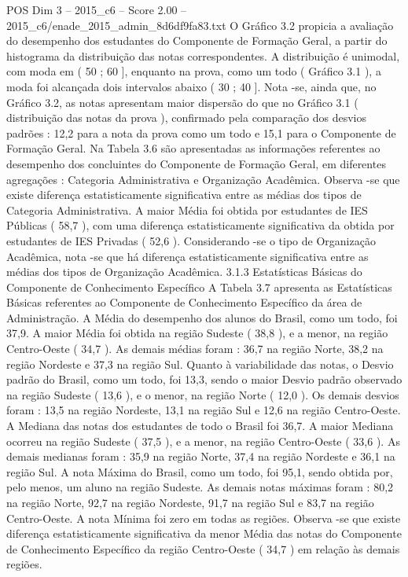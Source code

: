 \begin{textsample}{POS Dim 3 – 2015\_c6 – Score 2.00 – 2015\_c6/enade\_2015\_admin\_8d6df9fa83.txt}
O Gráfico 3.2 propicia a avaliação do desempenho dos estudantes do Componente de Formação Geral, a partir do histograma da distribuição das notas correspondentes.
A distribuição é unimodal, com moda em ( 50 ; 60 ], enquanto na prova, como um todo ( Gráfico 3.1 ), a moda foi alcançada dois intervalos abaixo ( 30 ; 40 ].
Nota -se, ainda que, no Gráfico 3.2, as notas apresentam maior dispersão do que no Gráfico 3.1 ( distribuição das notas da prova ), confirmado pela comparação dos desvios padrões : 12,2 para a nota da prova como um todo e 15,1 para o Componente de Formação Geral.
Na Tabela 3.6 são apresentadas as informações referentes ao desempenho dos concluintes do Componente de Formação Geral, em diferentes agregações : Categoria Administrativa e Organização Acadêmica.
Observa -se que existe diferença estatisticamente significativa entre as médias dos tipos de Categoria Administrativa.
A maior Média foi obtida por estudantes de IES Públicas ( 58,7 ), com uma diferença estatisticamente significativa da obtida por estudantes de IES Privadas ( 52,6 ).
Considerando -se o tipo de Organização Acadêmica, nota -se que há diferença estatisticamente significativa entre as médias dos tipos de Organização Acadêmica. 3.1.3 Estatísticas Básicas do Componente de Conhecimento Específico A Tabela 3.7 apresenta as Estatísticas Básicas referentes ao Componente de Conhecimento Específico da área de Administração.
A Média do desempenho dos alunos do Brasil, como um todo, foi 37,9.
A maior Média foi obtida na região Sudeste ( 38,8 ), e a menor, na região Centro-Oeste ( 34,7 ).
As demais médias foram : 36,7 na região Norte, 38,2 na região Nordeste e 37,3 na região Sul.
Quanto à variabilidade das notas, o Desvio padrão do Brasil, como um todo, foi 13,3, sendo o maior Desvio padrão observado na região Sudeste ( 13,6 ), e o menor, na região Norte ( 12,0 ).
Os demais desvios foram : 13,5 na região Nordeste, 13,1 na região Sul e 12,6 na região Centro-Oeste.
A Mediana das notas dos estudantes de todo o Brasil foi 36,7.
A maior Mediana ocorreu na região Sudeste ( 37,5 ), e a menor, na região Centro-Oeste ( 33,6 ).
As demais medianas foram : 35,9 na região Norte, 37,4 na região Nordeste e 36,1 na região Sul.
A nota Máxima do Brasil, como um todo, foi 95,1, sendo obtida por, pelo menos, um aluno na região Sudeste.
As demais notas máximas foram : 80,2 na região Norte, 92,7 na região Nordeste, 91,7 na região Sul e 83,7 na região Centro-Oeste.
A nota Mínima foi zero em todas as regiões.
Observa -se que existe diferença estatisticamente significativa da menor Média das notas do Componente de Conhecimento Específico da região Centro-Oeste ( 34,7 ) em relação às demais regiões.

\end{textsample}
